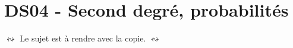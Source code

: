 \documentclass[a4paper,11pt]{article}
\author{Pierquet}
\title{\nomfichier}
\begin{document}
\pagestyle{fancy}

\thispagestyle{enteteds}

\setcounter{numexos}{0}

\part{DS04 - Second degré, probabilités}

\smallskip

\nomprenomtcbox

\begin{marker}$\leftrightsquigarrow$ Le sujet est à rendre avec la copie. $\leftrightsquigarrow$\end{marker}


\medskip
\end{document}
